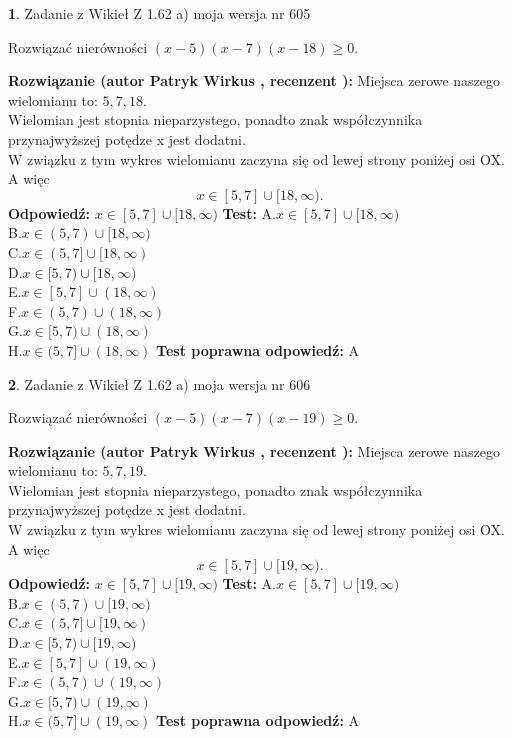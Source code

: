 \documentclass[12pt, a4paper]{article}
\theoremstyle{definition} %
\newtheorem{zad}{}
\newcommand{\zadStart}[1]{\begin{zad}#1\newline}
\newcommand{\zadStop}{\end{zad}}
\newcommand{\rozwStart}[2]{\noindent \textbf{Rozwiązanie (autor #1 , recenzent #2): }\newline}
\newcommand{\rozwStop}{\newline}
\newcommand{\odpStart}{\noindent \textbf{Odpowiedź:}\newline}
\newcommand{\odpStop}{\newline}
\newcommand{\testStart}{\noindent \textbf{Test:}\newline}
\newcommand{\testStop}{\newline}
\newcommand{\kluczStart}{\noindent \textbf{Test poprawna odpowiedź:}\newline}
\newcommand{\kluczStop}{\newline}
\begin{document}
\zadStart{Zadanie z Wikieł Z 1.62 a) moja wersja nr 605}

Rozwiązać nierówności $(x-5)(x-7)(x-18)\ge0$.
\zadStop
\rozwStart{Patryk Wirkus}{}
Miejsca zerowe naszego wielomianu to: $5, 7, 18$.\\
Wielomian jest stopnia nieparzystego, ponadto znak współczynnika przy\linebreak najwyższej potędze x jest dodatni.\\ W związku z tym wykres wielomianu zaczyna się od lewej strony poniżej osi OX. A więc $$x \in [5,7] \cup [18,\infty).$$
\rozwStop
\odpStart
$x \in [5,7] \cup [18,\infty)$
\odpStop
\testStart
A.$x \in [5,7] \cup [18,\infty)$\\
B.$x \in (5,7) \cup [18,\infty)$\\
C.$x \in (5,7] \cup [18,\infty)$\\
D.$x \in [5,7) \cup [18,\infty)$\\
E.$x \in [5,7] \cup (18,\infty)$\\
F.$x \in (5,7) \cup (18,\infty)$\\
G.$x \in [5,7) \cup (18,\infty)$\\
H.$x \in (5,7] \cup (18,\infty)$
\testStop
\kluczStart
A
\kluczStop



\zadStart{Zadanie z Wikieł Z 1.62 a) moja wersja nr 606}

Rozwiązać nierówności $(x-5)(x-7)(x-19)\ge0$.
\zadStop
\rozwStart{Patryk Wirkus}{}
Miejsca zerowe naszego wielomianu to: $5, 7, 19$.\\
Wielomian jest stopnia nieparzystego, ponadto znak współczynnika przy\linebreak najwyższej potędze x jest dodatni.\\ W związku z tym wykres wielomianu zaczyna się od lewej strony poniżej osi OX. A więc $$x \in [5,7] \cup [19,\infty).$$
\rozwStop
\odpStart
$x \in [5,7] \cup [19,\infty)$
\odpStop
\testStart
A.$x \in [5,7] \cup [19,\infty)$\\
B.$x \in (5,7) \cup [19,\infty)$\\
C.$x \in (5,7] \cup [19,\infty)$\\
D.$x \in [5,7) \cup [19,\infty)$\\
E.$x \in [5,7] \cup (19,\infty)$\\
F.$x \in (5,7) \cup (19,\infty)$\\
G.$x \in [5,7) \cup (19,\infty)$\\
H.$x \in (5,7] \cup (19,\infty)$
\testStop
\kluczStart
A
\kluczStop
\end{document}
